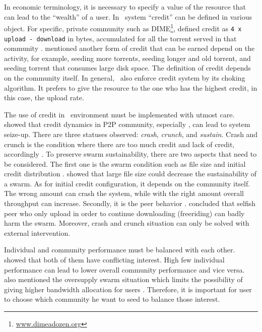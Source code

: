 In economic terminology, it is necessary to specify a value of the resource that can lead to the ``wealth'' of a user. In \bt~system ``credit'' can be defined in various object. For specific, private community such as DIME\footnote{\url{www.dimeadozen.org}}, \citeauthor{2012:economicbt:kash}  defined credit as \texttt{4 x upload - download} in bytes, accumulated for all the torrent served in that community \cite{2012:economicbt:kash}. \citeauthor{2014:sustainabilitytorrent:chen} mentioned another form of credit that can be earned depend on the activity, for example, seeding more torrents, seeding longer and old torrent, and seeding torrent that consumes large disk space\cite{2014:sustainabilitytorrent:chen}. The definition of credit depends on the community itself. In general, \bt~also enforce credit system by its choking algorithm. It prefers to give the resource to the one who has the highest credit, in this case, the upload rate.

The use of credit in \bt~environment must be implemented with utmost care. \citeauthor{2010:crashsustain:rahman} showed that credit dynamics in P2P community, especially \bt, can lead to system seize-up. There are three statuses observed: \textit{crash}, \textit{crunch}, and \textit{sustain}. Crash and crunch is the condition where there are too much credit and lack of credit, accordingly \cite{2015:sustainabilitypt:vinko}. To preserve swarm sustainability, there are two aspects that need to be considered. The first one is the swarm condition such as file size and initial credit distribution \cite{2015:sustainabilitypt:vinko}. \citeauthor{2015:sustainabilitypt:vinko} showed that large file size could decrease the sustainability of a swarm. As for initial credit configuration, it depends on the community itself. The wrong amount can crash the system, while with the right amount overall throughput can increase. Secondly, it is the peer behavior \cite{2010:crashsustain:rahman}. \citeauthor{2010:crashsustain:rahman} concluded that selfish peer who only upload in order to continue downloading (freeriding) can badly harm the swarm. Moreover, crash and crunch situation can only be solved with external intervention.

Individual and community performance must be balanced with each other. \citeauthor{2015:sustainabilitypt:vinko} showed that both of them have conflicting interest. High few individual performance can lead to lower overall community performance and vice versa.  \citeauthor{2013:survivepriv:jia} also mentioned the oversupply swarm situation which limits the possibility of giving higher bandwidth allocation for users \cite{2013:survivepriv:jia}. Therefore, it is important for user to choose which community he want to seed to balance those interest.

